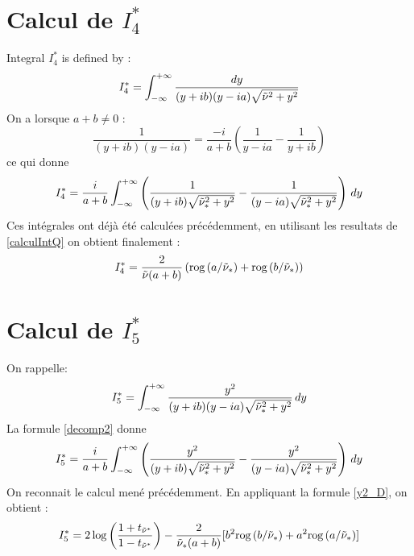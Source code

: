 \section{Calcul de $I_4^*$}
\label{calcI4}
Integral $I_4^*$ is defined by :
\begin{equation}
I_4^*=\int_{-\infty}^{+\infty} \dfrac{dy}{(y+ib)(y-ia)\sqrt{\tilde{\nu}^2+y^2}}
\label{defI4}
\end{equation}
On a lorsque $a+b\neq0$ :
\begin{equation}
    \frac{1}{(y+ib)(y-ia)}=\frac{-i}{a+b}\left( \frac{1}{y-ia}-\frac{1}{y+ib}\right)
    \label{decomp1}
\end{equation}
ce qui donne
\begin{equation*}
I_4^*=\frac{i}{a+b} \int_{-\infty}^{+\infty} \left(\frac{1}{(y+ib)\sqrt{\tilde{\nu}_*^2+y^2}}-\frac{1}{(y-ia)\sqrt{\tilde{\nu}_*^2+y^2}} \right)\,dy
\end{equation*}
Ces intégrales ont déjà été calculées précédemment, en utilisant les resultats de \ref{calculIntQ} on obtient finalement :
\begin{equation}
I_4^*=\frac{2}{\tilde{\nu}(a+b)}\left(\mbox{rog}\left(a/\tilde{\nu}_*\right)+\mbox{rog}\left(b/\tilde{\nu}_*\right) \right)
\label{valI4}
\end{equation}
\section{Calcul de $I_5^*$}
\label{calcI5}
On rappelle:
\begin{equation}
I_5^*=\int_{-\infty}^{+\infty} \frac{y^2}{(y+ib)(y-ia)\sqrt{\tilde{\nu}_*^2+y^2}}\,dy
\end{equation}
La formule \eqref{decomp2} donne 
$$ I_5^*=\frac{i}{a+b}\int_{-\infty}^{+\infty}\left( \frac{y^2}{(y+ib)\sqrt{\tilde{\nu}^2_*+y^2}}-\frac{y^2}{(y-ia)\sqrt{\tilde{\nu}_*^2+y^2}}\right)\,dy $$
On reconnait le calcul mené précédemment. En appliquant la formule \eqref{y2_D}, on obtient :
\begin{equation}
I_5^*=2\log\left(\frac{1+t_{\tilde{\nu}^*}}{1-t_{\tilde{\nu}^*}}\right)-\frac{2}{\tilde{\nu}_*(a+b)}\lbrack b^2\mbox{rog}\left(b/\tilde{\nu}_*\right)+a^2\mbox{rog}\left(a/\tilde{\nu}_*\right)\rbrack
\label{intI5}
\end{equation}

